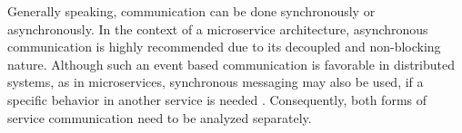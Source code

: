 
Generally speaking, communication can be done synchronously or asynchronously.
In the context of a microservice architecture, asynchronous communication is highly recommended due to its decoupled and non-blocking nature.
Although such an event based communication is favorable in distributed systems, as in microservices, synchronous messaging may also be used, if a specific behavior in another service is needed \cite[p~.34f]{Hofmann.2016}\cite[p.~89]{Newman.2015}.
Consequently, both forms of service communication need to be analyzed separately.

\label{cha:Technologies:communication:synchronous}
\clearpage
\label{cha:Technologies:communication:asynchronous}

